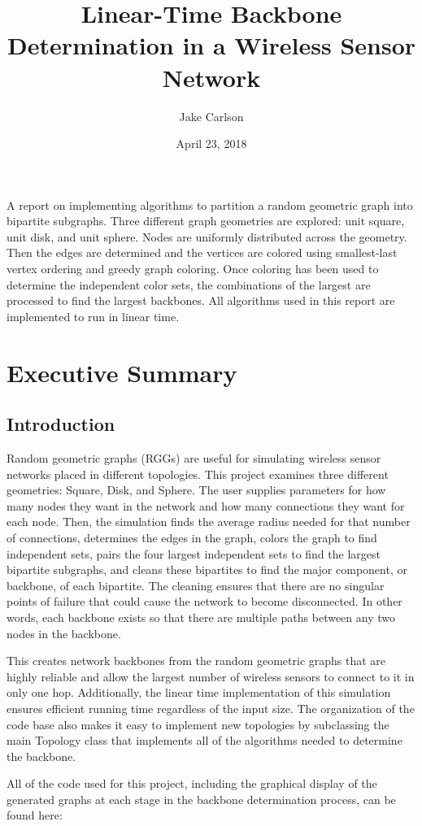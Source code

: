 \documentclass{article}
\begin{document}
\title{Linear-Time Backbone Determination in a Wireless Sensor Network}
\author{Jake Carlson}
\date{April 23, 2018}
\maketitle

\abstract
A report on implementing algorithms to partition a random geometric graph into bipartite subgraphs. Three different graph geometries are explored: unit square, unit disk, and unit sphere. Nodes are uniformly distributed across the geometry. Then the edges are determined and the vertices are colored using smallest-last vertex ordering and greedy graph coloring. Once coloring has been used to determine the independent color sets, the combinations of the largest are processed to find the largest backbones. All algorithms used in this report are implemented to run in linear time.
\newpage

\tableofcontents
\lstlistoflistings
\newpage

\section{Executive Summary}

    \subsection{Introduction}
    Random geometric graphs (RGGs) are useful for simulating wireless sensor networks placed in different topologies. This project examines three different geometries: Square, Disk, and Sphere. The user supplies parameters for how many nodes they want in the network and how many connections they want for each node. Then, the simulation finds the average radius needed for that number of connections, determines the edges in the graph, colors the graph to find independent sets, pairs the four largest independent sets to find the largest bipartite subgraphs, and cleans these bipartites to find the major component, or backbone, of each bipartite. The cleaning ensures that there are no singular points of failure that could cause the network to become disconnected. In other words, each backbone exists so that there are multiple paths between any two nodes in the backbone.
    \par
    This creates network backbones from the random geometric graphs that are highly reliable and allow the largest number of wireless sensors to connect to it in only one hop. Additionally, the linear time implementation of this simulation ensures efficient running time regardless of the input size. The organization of the code base also makes it easy to implement new topologies by subclassing the main Topology class that implements all of the algorithms needed to determine the backbone.
    \par
    All of the code used for this project, including the graphical display of the generated graphs at each stage in the backbone determination process, can be found here:
\end{document}
